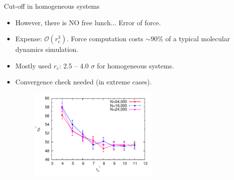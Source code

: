 \documentclass{beamer}
\newcommand{\redc}[1]{{\color{red} #1}}
\begin{document}
\begin{frame}{Cut-off in homogeneous systems}
  \begin{itemize}
  \item<1-> However, there is \redc{NO} free lunch... Error of force.
  \item<2-> Expense: \redc{$\mathcal O(r_c^3)$}. Force computation costs \redc{$ \sim 90 \%$} of a typical molecular dynamics simulation.
  \item<3-> Mostly used $r_c$: 2.5 -- 4.0 $\sigma$ for homogeneous systems.
  \item<4->\redc{Convergence check} needed (in extreme cases).
  \begin{figure}
      \centering
      \includegraphics[width=0.6\textwidth]{figs/simple-cut-conv/natom-rcut-c.pdf}
    \end{figure}
  \end{itemize}
\end{frame}
\end{document}
